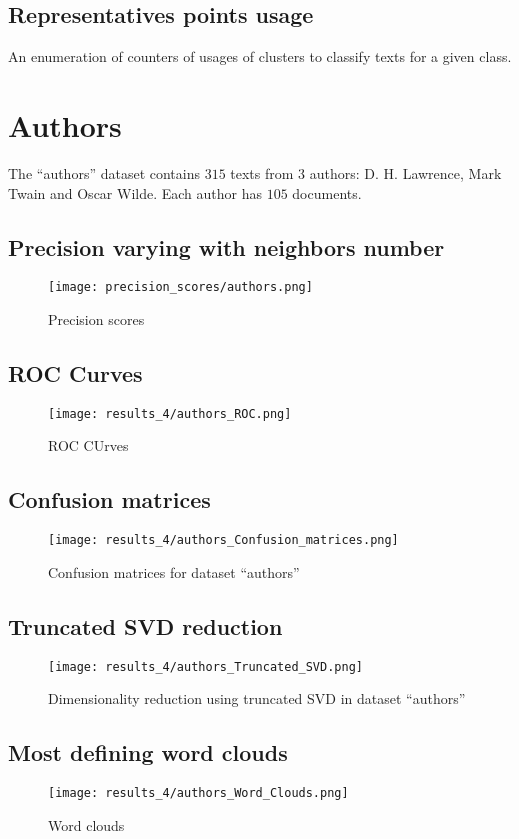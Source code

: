 \documentclass[\main/main.tex]{subfiles}
\begin{document}
\subsection{Representatives points usage}
An enumeration of counters of usages of clusters to classify texts for a given class.

\clearpage
\section{Authors}
The ``authors'' dataset contains \(315\) texts from 3 authors: D. H. Lawrence, Mark Twain and Oscar Wilde. Each author has \(105\) documents.
\subsection{Precision varying with neighbors number}
\begin{figure}
	\texttt{[image: precision\_scores/authors.png]}
	\caption{Precision scores}
\end{figure}
\subsection{ROC Curves}
\begin{figure}
	\texttt{[image: results\_4/authors\_ROC.png]}
	\caption{ROC CUrves}
\end{figure}
\subsection{Confusion matrices}
\begin{figure}
	\texttt{[image: results\_4/authors\_Confusion\_matrices.png]}
	\caption{Confusion matrices for dataset ``authors''}
\end{figure}
\subsection{Truncated SVD reduction}
\begin{figure}
	\texttt{[image: results\_4/authors\_Truncated\_SVD.png]}
	\caption{Dimensionality reduction using truncated SVD in dataset ``authors''}
\end{figure}
\subsection{Most defining word clouds}
\begin{figure}
	\texttt{[image: results\_4/authors\_Word\_Clouds.png]}
	\caption{Word clouds}
\end{figure}
\end{document}

